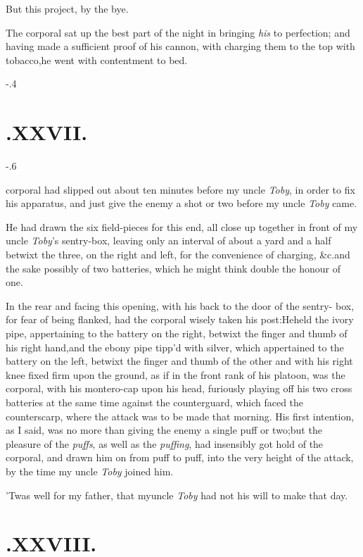 \documentclass{article}
\begin{document}
\tsh But this project, by the bye.

The corporal sat up the best part of the night in bringing
\textit{his} to perfection; and having made a sufficient proof of his cannon,
with charging them to the top with tobacco,\tsk he went with
contentment to bed.

\enlargethispage{\baselineskip}
\kern-.4\baselineskip
\section{.\enspace XXVII.}

\kern-.6\baselineskip

 corporal had slipped out about
ten minutes before my uncle \textit{Toby}, in order to fix his
apparatus, and just give the enemy a shot or two before my uncle
\textit{Toby} came.

He had drawn the six field-pieces for this end, all close up
together in front of my uncle \textit{Toby}’s sentry-box,
leaving only an interval of about a yard and a half betwixt the
three, on the right and left, for the convenience of charging,
\&c.\tsk and the sake possibly of two batteries, which he
might think double the honour of one.

In the rear and facing this opening, with his back to the door
of the sentry- box, for fear of being flanked, had the corporal
wisely taken his post:\tsh He\break held the ivory pipe, appertaining to the battery on
the right, betwixt the finger and thumb of his right
hand,\tsk and the ebony pipe tipp’d with silver, which
appertained to the battery on the left, betwixt the finger and
thumb of the other\break
\tsh and with his right knee fixed firm
upon the ground, as if in the front rank of his platoon, was the
corporal, with his montero-cap upon his head, furiously playing off
his two cross batteries at the same time against the counterguard,
which faced the counterscarp, where the attack was to be made that
morning.\break
His first intention, as I said, was no more than giving
the enemy a single puff or two;\tsk but the pleasure of the
\textit{puffs}, as well as the \textit{puffing}, had insensibly got
hold of the corporal, and drawn him on from puff to puff, into the
very height of the attack, by the time my uncle \textit{Toby} joined
him.

’Twas well for my father, that my\break uncle \textit{Toby} had
not his will to make that day.

\section{.\enspace XXVIII.}
\end{document}
